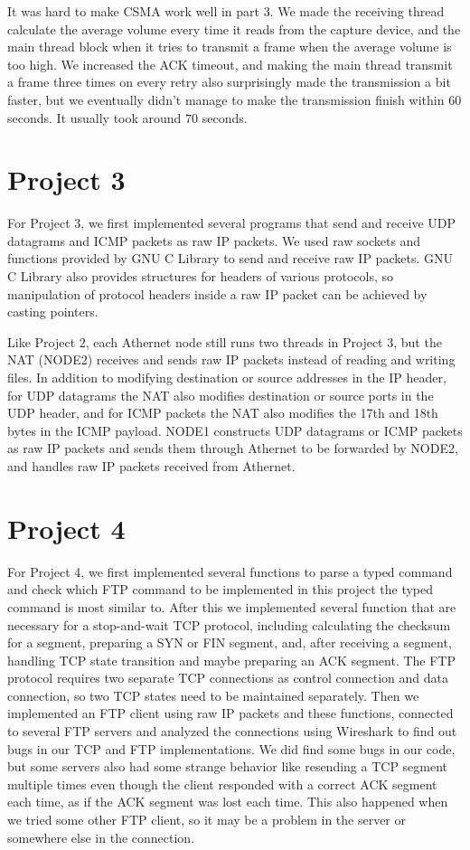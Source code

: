 \documentclass{scrartcl}
\begin{document}
It was hard to make CSMA work well in part 3. We made the receiving thread calculate the average volume every time it reads from the capture device, and the main thread block when it tries to transmit a frame when the average volume is too high. We increased the ACK timeout, and making the main thread transmit a frame three times on every retry also surprisingly made the transmission a bit faster, but we eventually didn't manage to make the transmission finish within $60$ seconds. It usually took around $70$ seconds.

\section*{Project 3}

For Project 3, we first implemented several programs that send and receive UDP datagrams and ICMP packets as raw IP packets. We used raw sockets and functions provided by GNU C Library to send and receive raw IP packets. GNU C Library also provides structures for headers of various protocols, so manipulation of protocol headers inside a raw IP packet can be achieved by casting pointers.

Like Project 2, each Athernet node still runs two threads in Project 3, but the NAT (NODE2) receives and sends raw IP packets instead of reading and writing files. In addition to modifying destination or source addresses in the IP header, for UDP datagrams the NAT also modifies destination or source ports in the UDP header, and for ICMP packets the NAT also modifies the 17th and 18th bytes in the ICMP payload. NODE1 constructs UDP datagrams or ICMP packets as raw IP packets and sends them through Athernet to be forwarded by NODE2, and handles raw IP packets received from Athernet.

\section*{Project 4}

For Project 4, we first implemented several functions to parse a typed command and check which FTP command to be implemented in this project the typed command is most similar to. After this we implemented several function that are necessary for a stop-and-wait TCP protocol, including calculating the checksum for a segment, preparing a SYN or FIN segment, and, after receiving a segment, handling TCP state transition and maybe preparing an ACK segment. The FTP protocol requires two separate TCP connections as control connection and data connection, so two TCP states need to be maintained separately. Then we implemented an FTP client using raw IP packets and these functions, connected to several FTP servers and analyzed the connections using Wireshark to find out bugs in our TCP and FTP implementations. We did find some bugs in our code, but some servers also had some strange behavior like resending a TCP segment multiple times even though the client responded with a correct ACK segment each time, as if the ACK segment was lost each time. This also happened when we tried some other FTP client, so it may be a problem in the server or somewhere else in the connection.
\end{document}

